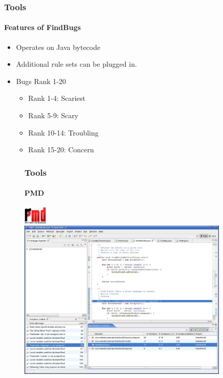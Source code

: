 \documentclass{beamer}
\begin{document}
\begin{frame}
\frametitle{Tools}
\framesubtitle{Features of FindBugs}
\begin{itemize}
\item<1-> Operates on Java bytecode
\item<2-> Additional rule sets can be plugged in.
\item<3-> Bugs Rank 1-20
\begin{itemize}
\item<4-> Rank 1-4: Scariest
\item<5-> Rank 5-9: Scary
\item<6-> Rank 10-14: Troubling
\item<7-> Rank 15-20: Concern
\end{itemize}
\end{itemize}
\end{frame}

\begin{frame}
\begin{figure}
\frametitle{Tools}
\framesubtitle{PMD}
\includegraphics[width=0.1\textwidth]{pmd_logo}
\includegraphics[width=0.9\textwidth]{PMD_eclipse.jpg}
\end{figure}
\end{frame}
\end{document}
